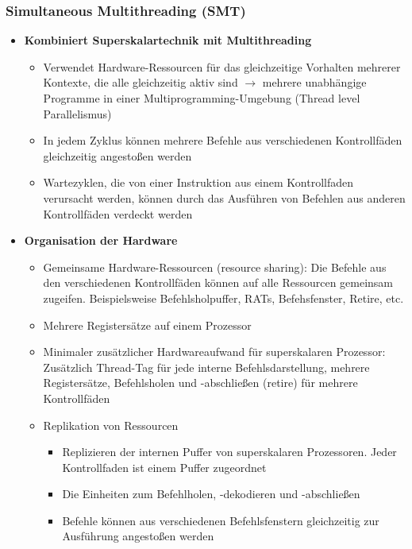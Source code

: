\subsubsection{Simultaneous Multithreading (SMT)}
\begin{itemize}
	\item \textbf{Kombiniert Superskalartechnik mit Multithreading}
	\begin{itemize}
		\item Verwendet Hardware-Ressourcen für das gleichzeitige Vorhalten mehrerer Kontexte, die alle gleichzeitig aktiv sind \(\rightarrow\) mehrere unabhängige Programme in einer Multiprogramming-Umgebung (Thread level Parallelismus)
		\item In jedem Zyklus können mehrere Befehle aus verschiedenen Kontrollfäden gleichzeitig angestoßen werden
		\item Wartezyklen, die von einer Instruktion aus einem Kontrollfaden verursacht werden, können durch das Ausführen von Befehlen aus anderen Kontrollfäden verdeckt werden
	\end{itemize}
	\item \textbf{Organisation der Hardware}
	\begin{itemize}
		\item Gemeinsame Hardware-Ressourcen (resource sharing): Die Befehle aus den verschiedenen Kontrollfäden können auf alle Ressourcen gemeinsam zugeifen. Beispielsweise Befehlsholpuffer, RATs, Befehsfenster, Retire, etc.
		\item Mehrere Registersätze auf einem Prozessor
		\item Minimaler zusätzlicher Hardwareaufwand für superskalaren Prozessor: Zusätzlich Thread-Tag für jede interne Befehlsdarstellung, mehrere Registersätze, Befehlsholen und -abschließen (retire) für mehrere Kontrollfäden
		\item Replikation von Ressourcen
		\begin{itemize}
			\item Replizieren der internen Puffer von superskalaren Prozessoren. Jeder Kontrollfaden ist einem Puffer zugeordnet
			\item Die Einheiten zum Befehlholen, -dekodieren und -abschließen
			\item Befehle können aus verschiedenen Befehlsfenstern gleichzeitig zur Ausführung angestoßen werden
		\end{itemize}
	\end{itemize}
\end{itemize}


